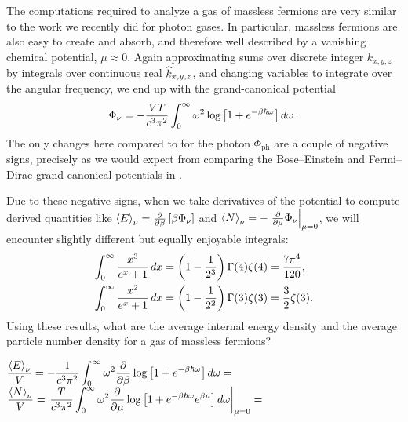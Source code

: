 The computations required to analyze a gas of massless fermions are very similar to the work we recently did for photon gases.
In particular, massless fermions are also easy to create and absorb, and therefore well described by a vanishing chemical potential, $\mu \approx 0$.
Again approximating sums over discrete integer $k_{x, y, z}$ by integrals over continuous real $\widehat k_{x, y, z}$, and changing variables to integrate over the angular frequency, we end up with the grand-canonical potential
\begin{align}
  \Phi_{\nu} = -\frac{VT}{c^3 \pi^2} \int_0^{\infty} \omega^2 \log\left[1 + e^{-\beta \hbar \omega}\right] \mathop{d\omega}. \label{eq:neutrino_grand}
\end{align}
The only changes here compared to  for the photon $\Phi_{\text{ph}}$ are a couple of negative signs, precisely as we would expect from comparing the Bose--Einstein and Fermi--Dirac grand-canonical potentials in .

Due to these negative signs, when we take derivatives of the potential to compute derived quantities like $\left\langle E \right\rangle_{\nu} = \frac{\partial }{\partial \beta} \left[\beta \Phi_{\nu}\right]$ and $\left\langle N \right\rangle_{\nu} = -\left. \frac{\partial }{\partial \mu} \Phi_{\nu}\right|_{\mu = 0}$, we will encounter slightly different but equally enjoyable integrals: %
\begin{align*}
  \int_0^{\infty} \frac{x^3}{e^x + 1} \mathop{dx} & = \left(1 - \frac{1}{2^3}\right) \Gamma(4) \zeta(4) = \frac{7\pi^4}{120}, \\
  \int_0^{\infty} \frac{x^2}{e^x + 1} \mathop{dx} & = \left(1 - \frac{1}{2^2}\right) \Gamma(3) \zeta(3) = \frac{3}{2} \zeta(3).
\end{align*}
Using these results, what are the average internal energy density and the average particle number density for a gas of massless fermions?
\begin{mdframed}
  $\displaystyle \frac{\left\langle E \right\rangle_{\nu}}{V} = -\frac{1}{c^3 \pi^2} \int_0^{\infty} \omega^2 \frac{\partial }{\partial \beta} \log\left[1 + e^{-\beta \hbar \omega}\right] \mathop{d\omega} = $ \\[110 pt]
  $\displaystyle \frac{\left\langle N \right\rangle_{\nu}}{V} = \left. \frac{T}{c^3 \pi^2} \int_0^{\infty} \omega^2 \frac{\partial }{\partial \mu} \log\left[1 + e^{-\beta \hbar \omega} e^{\beta \mu}\right] \mathop{d\omega} \right|_{\mu = 0} = $ \\[100 pt]
\end{mdframed}

